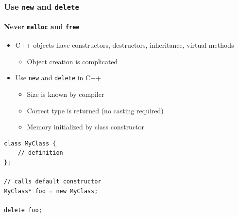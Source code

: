 \documentclass[table]{beamer}
\newcounter{rulecount}
\newcommand{\declarerule}{\textbf{\color{themeblue}{Rule \therulecount:}} }
\begin{document}
\begin{frame}[fragile]
    \frametitle{\declarerule Use \texttt{new} and \texttt{delete} }
    \framesubtitle{Never \texttt{malloc} and \texttt{free} }
    \begin{itemize}
        \item C++ objects have constructors, destructors, inheritance, virtual methods
            \begin{itemize}
                \item Object creation is complicated
            \end{itemize}
        \item Use \texttt{new} and \texttt{delete} in C++
            \begin{itemize}
                \item Size is known by compiler
                \item Correct type is returned (no casting required)
                \item Memory initialized by class constructor
            \end{itemize}
    \end{itemize}
    \begin{lstlisting}[title=Dynamically allocating an object in C++]
class MyClass {
    // definition
};

// calls default constructor
MyClass* foo = new MyClass;

delete foo;
    \end{lstlisting}
\end{frame}

\end{document}
